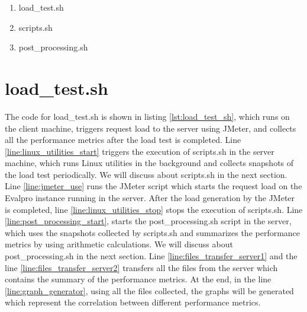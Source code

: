 \documentclass{iitbreport}
\begin{document}
\begin{enumerate}
    \item 
    load\_test.sh
    \item
    scripts.sh
    \item
    post\_processing.sh
\end{enumerate}

\section{load\_test.sh}

The code for load\_test.sh is shown in listing \ref{lst:load_test_sh}, which runs on the client machine, triggers request load to the server using JMeter, and collects all the performance metrics after the load test is completed. Line \ref{line:linux_utilities_start} triggers the execution of scripts.sh in the server machine, which runs Linux utilities in the background and collects snapshots of the load test periodically. We will discuss about scripts.sh in the next section. Line \ref{line:jmeter_use} runs the JMeter script which starts the request load on the Evalpro instance running in the server. After the load generation by the JMeter is completed, line \ref{line:linux_utilities_stop} stops the execution of scripts.sh. Line \ref{line:post_processing_start}, starts the post\_processing.sh script in the server, which uses the snapshots collected by scripts.sh and summarizes the performance metrics by using arithmetic calculations. We will discuss about post\_processing.sh in the next section. Line \ref{line:files_transfer_server1} and the line \ref{line:files_transfer_server2} transfers all the files from the server which contains the summary of the performance metrics. At the end, in the line \ref{line:graph_generator}, using all the files collected, the graphs will be generated which represent the correlation between  different performance metrics.



\lstset{language=bash}
\lstset{frame=lines}
\lstset{breaklines=true}
\lstset{numbers=left,
    stepnumber=1}
    
\end{document}
